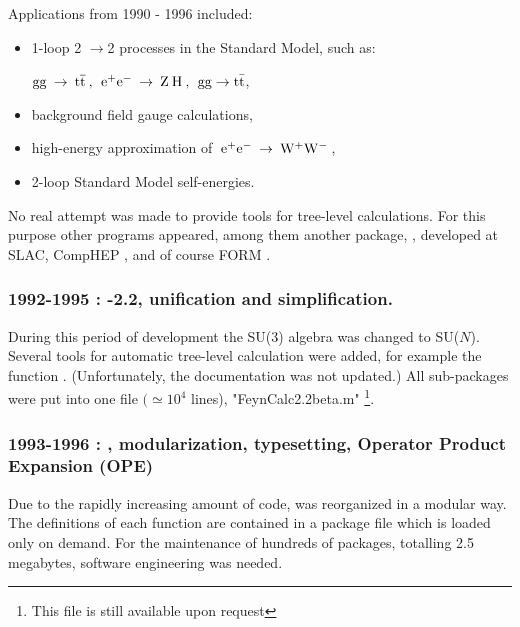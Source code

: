 Applications from 1990 - 1996  included:

\begin{itemize}

\item 1-loop 2 \(\rightarrow \)2 processes in the Standard
Model, such as:

\({\rm gg}\> \rightarrow \> 
{\rm t \overline{t}} \> , \> \>
{{\rm e}^+}{{\rm e}^-}\> \rightarrow \> {\rm Z}\> {\rm H}\>, \> \>
{\rm gg} \rightarrow {\rm t\bar{t}} \),

\item background field gauge calculations,

\item high-energy approximation of \(\>{{\rm e}^+}
{{\rm e}^-}\> \rightarrow \> {{\rm W}^+}{{\rm W}^-}\> \),

\item  2-loop Standard Model self-energies.

\end{itemize}

No real attempt was made to provide tools for tree-level calculations. 
For this purpose other programs appeared, among them another  \mma package, \hip \cite{yeh}, developed at SLAC, 
CompHEP \cite{Pukhov:1999gg}, and of course FORM \cite{Vermaseren:2000nd}.

\subsubsection*{1992-1995 : -2.2, unification and simplification.}

During this period of development the SU(3) algebra was changed to SU($N$). Several tools for automatic tree-level calculation were added, for example the function . (Unfortunately, the  documentation was not updated.) All sub-packages were put into one file \(\big(\simeq {{10}^4}\) lines), "FeynCalc2.2beta.m" \footnote{This file is still available upon request}.

\subsubsection*{1993-1996 : , modularization, typesetting, Operator Product Expansion (OPE)}

Due to the rapidly increasing amount of code, \fc was reorganized in a modular way. The definitions of each function are contained in a package file which is loaded only on demand. For the maintenance of hundreds of packages, totalling 2.5 megabytes, software engineering was needed.

